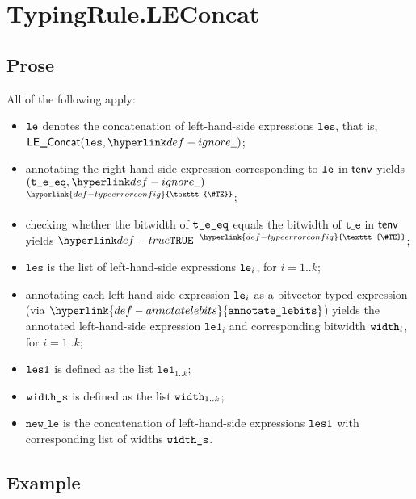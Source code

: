 \documentclass{book}
\newcommand\TypeErrorConfig[0]{\hyperlink{def-typeerrorconfig}{\texttt{\#TE}}}
\newcommand\ProseOrTypeError[0]{\hyperlink{def-proseortypeerror}{$^{\TypeErrorConfig}$}}
\newcommand\annotatelebits[0]{\hyperlink{def-annotatelebits}{\texttt{annotate\_lebits}}}
\newcommand\vte[0]{\texttt{t\_e}}
\newcommand\vleone[0]{\texttt{le1}}
\newcommand\newle[0]{\texttt{new\_le}}
\newcommand\les[0]{\texttt{les}}
\begin{document}

\section{TypingRule.LEConcat \label{sec:TypingRule.LEConcat}}

\subsection{Prose}
All of the following apply:
\begin{itemize}
  \item $\texttt{le}$ denotes the concatenation of left-hand-side expressions $\les$, that is, \\ $\LEConcat(\les, \Ignore)$;
  \item annotating the right-hand-side expression corresponding to $\texttt{le}$ in $\textsf{tenv}$ yields \\ $(\vteeq, \Ignore)$ \ProseOrTypeError;
  \item checking whether the bitwidth of $\texttt{t\_e\_eq}$ equals the bitwidth of $\vte$ in $\textsf{tenv}$ yields $\True$ \ProseOrTypeError;
  \item $\les$ is the list of left-hand-side expressions $\texttt{le}_i$, for $i=1..k$;
  \item annotating each left-hand-side expression $\texttt{le}_i$ as a bitvector-typed expression (via $\annotatelebits$)
        yields the annotated left-hand-side expression $\vleone_i$ and corresponding bitwidth $\texttt{width}_i$, for $i=1..k$;
  \item $\texttt{les1}$ is defined as the list $\vleone_{1..k}$;
  \item $\texttt{width\_s}$ is defined as the list $\texttt{width}_{1..k}$;
  \item $\newle$ is the concatenation of left-hand-side expressions $\texttt{les1}$ with corresponding list of widths $\texttt{width\_s}$.
\end{itemize}

\subsection{Example}

\end{document}
